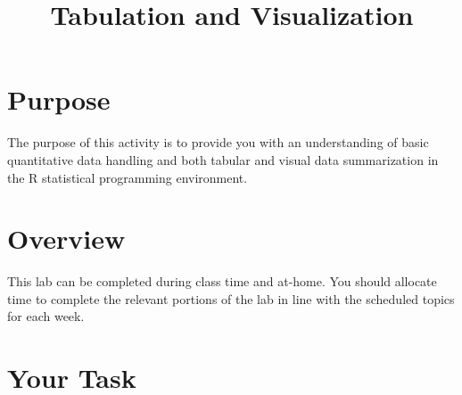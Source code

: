 \documentclass[a4paper,12pt]{article}
\title{Tabulation and Visualization}
\author{}
\date{}
\begin{document}
\vspace{-4em}

\maketitle

\vspace{-4em}

\section{Purpose}

The purpose of this activity is to provide you with an understanding of basic quantitative data handling and both tabular and visual data summarization in the R statistical programming environment.

\section{Overview}

This lab can be completed during class time and at-home. You should allocate time to complete the relevant portions of the lab in line with the scheduled topics for each week.

\section{Your Task}
\end{document}
